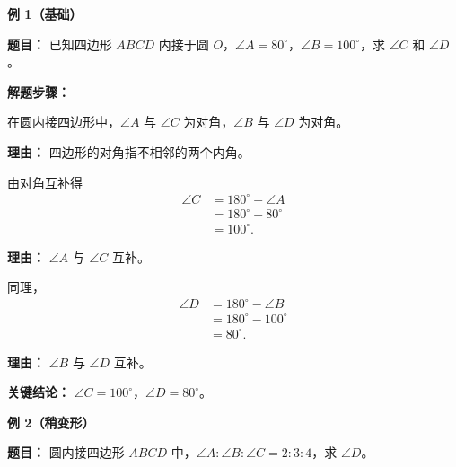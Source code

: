 \begin{examplebox}
	\textbf{\textcolor{CExample}{例 1（基础）}}

	\textbf{\textcolor{CExample}{题目：}}
	已知四边形 $ABCD$ 内接于圆 $O$，$\angle A=80^\circ$，$\angle B=100^\circ$，求 $\angle C$ 和 $\angle D$。

	\textbf{\textcolor{CExample}{解题步骤：}}
	\begin{description}[style=nextline, leftmargin=2.8em, labelsep=0.5em, itemsep=0.45em]
		\item[\textbf{第一步（识别对角）：}] 在圆内接四边形中，$\angle A$ 与 $\angle C$ 为对角，$\angle B$ 与 $\angle D$ 为对角。
			\par\textbf{理由：} 四边形的对角指不相邻的两个内角。
		\item[\textbf{第二步（应用互补）：}] 由对角互补得
			\[
				\begin{aligned}
					\angle C &= 180^\circ - \angle A \\
					&= 180^\circ - 80^\circ \\
					&= 100^\circ .
			\end{aligned}
			\]
			\par\textbf{理由：} $\angle A$ 与 $\angle C$ 互补。
		\item[\textbf{第三步（求另一角）：}] 同理，
			\[
				\begin{aligned}
					\angle D &= 180^\circ - \angle B \\
					&= 180^\circ - 100^\circ \\
					&= 80^\circ .
			\end{aligned}
			\]
			\par\textbf{理由：} $\angle B$ 与 $\angle D$ 互补。
	\end{description}

	\textbf{\textcolor{CExample}{关键结论：}}
	$\angle C=100^\circ$，$\angle D=80^\circ$。

	\medskip
	\textbf{\textcolor{CExample}{例 2（稍变形）}}

	\textbf{\textcolor{CExample}{题目：}}
	圆内接四边形 $ABCD$ 中，$\angle A:\angle B:\angle C=2:3:4$，求 $\angle D$。


\end{examplebox}
